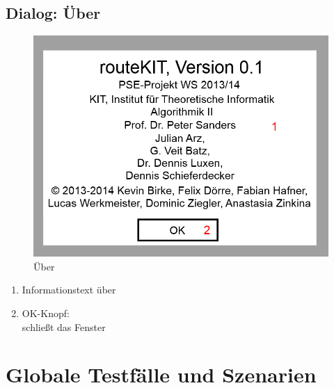 \documentclass[a4paper, 11pt]{article}
\begin{document}
\subsection{Dialog: Über}
\begin{figure}[H]
\centering
\includegraphics[width=0.7\linewidth]{mockup_screenshot_about}
\caption{Über}
\label{fig:mockupabout}
\end{figure}
\begin{enumerate}
\item Informationstext über \routeKIT
\item OK-Knopf:\\
schließt das Fenster
\end{enumerate}

\section{Globale Testfälle und Szenarien}
\end{document}
